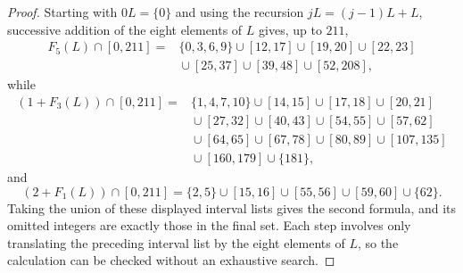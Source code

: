 \documentclass[12pt]{article}
\theoremstyle{plain}
\begin{document}
\begin{proof}
Starting with $0L=\{0\}$ and using the recursion
$jL=(j-1)L+L$, successive addition of the eight elements of $L$ gives,
up to $211$,
\[
\begin{aligned}
F_5(L)\cap[0,211]={}&\{0,3,6,9\}\cup[12,17]\cup[19,20]\cup[22,23]\\
 &{}\cup[25,37]\cup[39,48]\cup[52,208],
\end{aligned}
\]
while
\[
\begin{aligned}
(1+F_3(L))\cap[0,211]
={}&\{1,4,7,10\}\cup[14,15]\cup[17,18]\cup[20,21]\\
 &{}\cup[27,32]\cup[40,43]\cup[54,55]\cup[57,62]\\
 &{}\cup[64,65]\cup[67,78]\cup[80,89]\cup[107,135]\\
 &{}\cup[160,179]\cup\{181\},
\end{aligned}
\]
and
\[
 (2+F_1(L))\cap[0,211]
 =\{2,5\}\cup[15,16]\cup[55,56]\cup[59,60]\cup\{62\}.
\]
Taking the union of these displayed interval lists gives the second
formula, and its omitted integers are exactly those in the final set.
Each step involves only translating the preceding interval list by the
eight elements of $L$, so the calculation can be checked without an
exhaustive search.
\end{proof}
\end{document}
